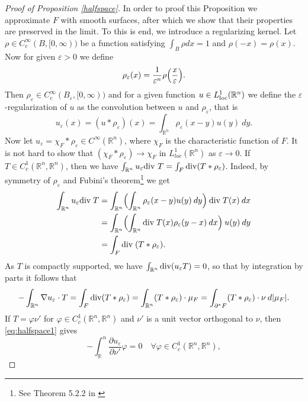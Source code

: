 \documentclass[artcle, 11pt, reqno]{amsart}
\numberwithin{equation}{section}
\newcommand{\R}{\mathbb{R}}
\newcommand{\dd}{\: d}
\newcommand{\divv}{\textnormal{div} \;}
\theoremstyle{plain}
\theoremstyle{definition}
\theoremstyle{remark}
\begin{document}
	\begin{proof}[Proof of Proposition \ref{halfspace}]
		In order to proof this Proposition we approximate $F$ with smooth surfaces, after which we show that their properties are preserved in the limit. To this is end, we introduce a regularizing kernel.
		Let $\rho \in C^\infty_c(B,[0,\infty))$ be a function satisfying $\int_B \rho dx =1$ and $\rho(-x)=\rho(x)$. Now for given $\varepsilon > 0$ we define 
		\[
		\rho_\varepsilon(x) = \frac{1}{\varepsilon^n}\rho \Bigl( \frac{x}{\varepsilon} \Bigr).
		\]
		Then $\rho_\varepsilon \in C^\infty_c(B_\varepsilon,[0,\infty))$ and for a given function $u \in L^1_\textnormal{loc}(\R^n)$ we define the $\varepsilon$-regularization of $u$ as the convolution between $u$ and $\rho_\varepsilon$, that is 
		\[
		u_\varepsilon(x) = (u \ast \rho_\varepsilon)(x) = \int_{\R^n} \rho_\varepsilon(x-y)u(y) \dd y.
		\]
		Now let $u_\varepsilon = \chi_F \ast \rho_\varepsilon \in C^\infty(\R^n)$, where $\chi_F$ is the characteristic function of $F$. It is not hard to show that $(\chi_F \ast \rho_\varepsilon) \rightarrow\chi_F$ in $L^1_{loc}(\R^n)$ as $\varepsilon \rightarrow0$. If $T \in C^1_c(\R^n,\R^n)$, then we have $\int_{\R^n} u_\varepsilon \textnormal{div }T = \int_F \textnormal{div}(T \ast \rho_\varepsilon)$. Indeed, by symmetry of $\rho_\varepsilon$ and Fubini's theorem\footnote{See Theorem 5.2.2 in \cite{cohn2013measure}} we get
		\begin{align*}
			\int_{\R^n} u_\varepsilon \divv T &= 
			\int_{\R^n} \Bigl( \int_{\R^n} \rho_\varepsilon(x-y)u(y)\dd y \Bigr)\: \divv T(x) \dd x \\ &=
			\int_{\R^n} \Bigl(\int_{\R^n} \divv T(x)\rho_\varepsilon(y-x) \dd x \Bigr)\: u(y) \dd y \\ &=
			\int_F \divv(T \ast \rho_\varepsilon).
		\end{align*}
		As $T$ is compactly supported, we have $\int_{\R^n} \textnormal{div}(u_\varepsilon T) = 0$, so that by integration by parts it follows that
		\begin{equation} \label{eq:halfspace1}
			- \int_{\R^n} \nabla u_\varepsilon \cdot T 
			=
			\int_F \textnormal{div}(T \ast \rho_\varepsilon) 
			= 
			\int_{\R^n}(T \ast \rho_\varepsilon) \cdot \mu_F 
			= 
			\int_{\partial^\ast F} (T \ast \rho_\varepsilon) \cdot \nu \dd |\mu_F|. 
		\end{equation}
		If $T = \varphi \nu'$ for $\varphi \in C^1_c(\R^n, \R^n)$ and $\nu'$ is a unit vector orthogonal to $\nu$, then \eqref{eq:halfspace1} gives 
		\[
		-\int_\R^n \frac{\partial u_\varepsilon}{\partial \nu'} \varphi = 0 \quad \forall  \varphi \in C^1_c(\R^n, \R^n),
\]
\end{proof}
\end{document}
